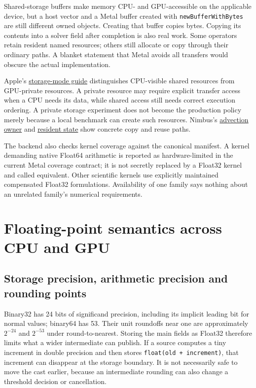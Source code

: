 Shared-storage buffers make memory CPU- and GPU-accessible on the applicable
device, but a host vector and a Metal buffer created with
\texttt{newBufferWithBytes} are still different owned objects. Creating that
buffer copies bytes. Copying its contents into a solver field after completion
is also real work. Some operators retain resident named resources; others
still allocate or copy through their ordinary paths. A blanket statement that
Metal avoids all transfers would obscure the actual implementation.

Apple's \href{https://developer.apple.com/documentation/metal/choosing-a-resource-storage-mode-for-apple-gpus}{storage-mode guide}
distinguishes CPU-visible shared resources from GPU-private resources. A
private resource may require explicit transfer access when a CPU needs its
data, while shared access still needs correct execution ordering. A private
storage experiment does not become the production policy merely because a
local benchmark can create such resources. Nimbus's
\href{../metal/src/compute/backend/advection.inc}{advection owner} and
\href{../metal/src/compute/internal/metal_resident_state.hpp}{resident state}
show concrete copy and reuse paths.

The backend also checks kernel coverage against the canonical manifest. A
kernel demanding native Float64 arithmetic is reported as hardware-limited
in the current Metal coverage contract; it is not secretly replaced by a
Float32 kernel and called equivalent. Other scientific kernels use explicitly
maintained compensated Float32 formulations. Availability of one family says
nothing about an unrelated family's numerical requirements.





\section{Floating-point semantics across CPU and GPU}
\label{architecture-numeric-portability}

\subsection{Storage precision, arithmetic precision and rounding points}

Binary32 has 24 bits of significand precision, including its implicit leading
bit for normal values; binary64 has 53. Their unit roundoffs near one are
approximately $2^{-24}$ and $2^{-53}$ under round-to-nearest. Storing the main
fields as Float32 therefore limits what a wider intermediate can publish.
If a source computes a tiny increment in double precision and then stores
\texttt{float(old + increment)}, that increment can disappear at the storage
boundary. It is not necessarily safe to move the cast earlier, because an
intermediate rounding can also change a threshold decision or cancellation.

